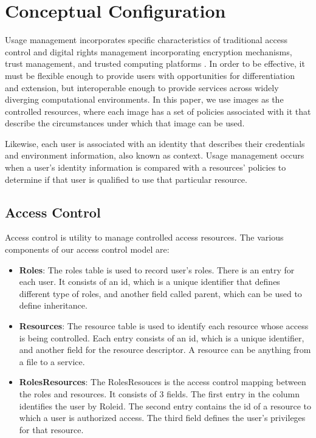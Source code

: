 \documentclass{sig-alternate}
\begin{document}
\section{Conceptual Configuration}
Usage management incorporates specific characteristics of traditional access control and digital rights management incorporating encryption mechanisms, trust management, and trusted computing platforms \cite{Jamkhedkar:2010:IUM:1866870.1866885}.  In order to be effective, it must be flexible enough to provide users with opportunities for differentiation and extension, but interoperable enough to provide services across widely diverging computational environments.  In this paper, we use images as the controlled resources, where each image has a set of policies associated with it that describe the circumstances under which that image can be used.

Likewise, each user is associated with an identity that describes their credentials and environment information, also known as context. Usage management occurs when a user's identity information is compared with a resources' policies to determine if that user is qualified to use that particular resource.

\subsection{Access Control}
Access control is utility to manage controlled access resources.  The various components of our access control model are:
\begin{itemize}

\item \textbf{Roles}: The roles table is used to record user's roles. There is an entry for each user. It consists of an id, which is a unique identifier that defines different type of roles, and another field called parent, which can be used to define inheritance.

\item \textbf{Resources}: The resource table is used to identify each resource whose access is being controlled. Each entry consists of an id, which is a unique identifier, and another field for the resource descriptor. A resource can be anything from a file to a service.

\item \textbf{RolesResources}: The RolesResouces is the access control mapping between the roles and resources. It consists of 3 fields. The first entry in the column identifies the user by Roleid. The second entry contains the id of a resource to which a user is authorized access. The third field defines the user's privileges for that resource.

\end{itemize} 
\end{document}
